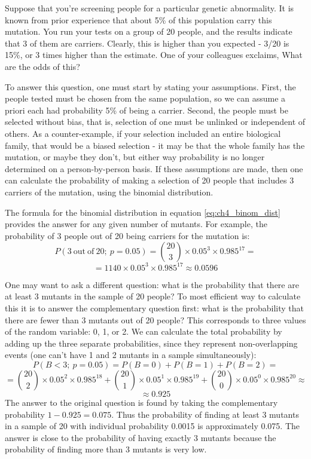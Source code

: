 \documentclass[
  letterpaper,
  DIV=11,
  numbers=noendperiod]{scrreprt}
\begin{document}
Suppose that you're screening people for a particular genetic
abnormality. It is known from prior experience that about 5\% of this
population carry this mutation. You run your tests on a group of 20
people, and the results indicate that 3 of them are carriers. Clearly,
this is higher than you expected - 3/20 is 15\%, or 3 times higher than
the estimate. One of your colleagues exclaims, What are the odds of
this?

To answer this question, one must start by stating your assumptions.
First, the people tested must be chosen from the same population, so we
can assume a priori each had probability 5\% of being a carrier. Second,
the people must be selected without bias, that is, selection of one must
be unlinked or independent of others. As a counter-example, if your
selection included an entire biological family, that would be a biased
selection - it may be that the whole family has the mutation, or maybe
they don't, but either way probability is no longer determined on a
person-by-person basis. If these assumptions are made, then one can
calculate the probability of making a selection of 20 people that
includes 3 carriers of the mutation, using the binomial distribution.

The formula for the binomial distribution in equation
\ref{eq:ch4_binom_dist} provides the answer for any given number of
mutants. For example, the probability of 3 people out of 20 being
carriers for the mutation is:
\[P(\mathrm{3 \ out \ of  \ 20}; \ p=0.05) = \binom{20}{3} \times 0.05^3  \times 0.985^{17} =  \]
\[ = 1140 \times 0.05^3 \times 0.985^{17} \approx 0.0596\]

One may want to ask a different question: what is the probability that
there are at least 3 mutants in the sample of 20 people? To most
efficient way to calculate this it is to answer the complementary
question first: what is the probability that there are fewer than 3
mutants out of 20 people? This corresponds to three values of the random
variable: 0, 1, or 2. We can calculate the total probability by adding
up the three separate probabilities, since they represent
non-overlapping events (one can't have 1 and 2 mutants in a sample
simultaneously): \[ P(B < 3; \  p=0.05) = P(B=0) + P(B=1) + P(B=2) = \]
\[ = \binom{20}{2} \times 0.05^2  \times 0.985^{18} +\binom{20}{1} \times 0.05^1  \times 0.985^{19} +\binom{20}{0} \times 0.05^0  \times 0.985^{20} \approx \]
\[ \approx 0.925 \] The answer to the original question is found by
taking the complementary probability \(1-0.925=0.075\). Thus the
probability of finding at least 3 mutants in a sample of 20 with
individual probability 0.0015 is approximately 0.075. The answer is
close to the probability of having exactly 3 mutants because the
probability of finding more than 3 mutants is very low.
\end{document}
